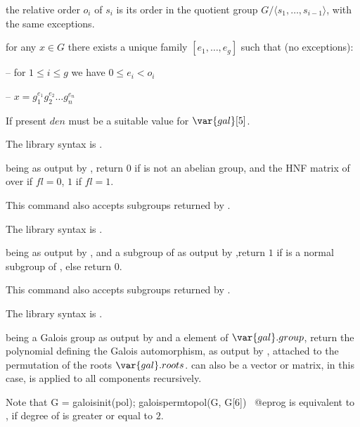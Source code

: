 \quad\item the relative order $o_i$ of $s_i$ is its order in the
quotient group $G/\langle s_1,\ldots,s_{i-1}\rangle$, with the same
exceptions.

\quad\item for any $x\in G$ there exists a unique family
$[e_1,\ldots,e_g]$ such that (no exceptions):

-- for $1\leq i \leq g$ we have $0\leq e_i<o_i$

-- $x=g_1^{e_1}g_2^{e_2}\ldots g_n^{e_n}$

If present $den$ must be a suitable value for $\var{gal}[5]$.

The library syntax is .

\label{se:galoisisabelian}
 being as output by , return $0$ if
 is not an abelian group, and the HNF matrix of  over
 if $fl=0$, $1$ if $fl=1$.

This command also accepts subgroups returned by .

The library syntax is .

\label{se:galoisisnormal}
 being as output by , and  a subgroup
of  as output by ,return $1$ if  is a
normal subgroup of , else return 0.

This command also accepts subgroups returned by .

The library syntax is .

\label{se:galoispermtopol}
 being a
Galois group as output by  and  a element of
$\var{gal}.group$, return the polynomial defining the Galois
automorphism, as output by , attached to the
permutation  of the roots $\var{gal}.roots$.  can
also be a vector or matrix, in this case,  is
applied to all components recursively.

\noindent Note that
\bprog
G = galoisinit(pol);
galoispermtopol(G, G[6])~
@eprog\noindent
is equivalent to , if degree of  is greater
or equal to $2$.

